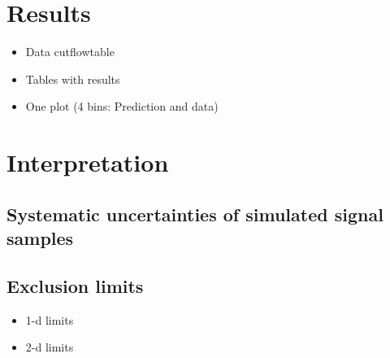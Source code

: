 \section{Results}
\label{sec:Results}
\begin{itemize}
\item Data cutflowtable
\item Tables with results
\item One plot (4 bins: Prediction and data)
\end{itemize}

\section{Interpretation}
\label{sec:Interpretation}
\subsection{Systematic uncertainties of simulated signal samples}
\subsection{Exclusion limits}
\begin{itemize}
\item 1-d limits
\item 2-d limits
\end{itemize}

